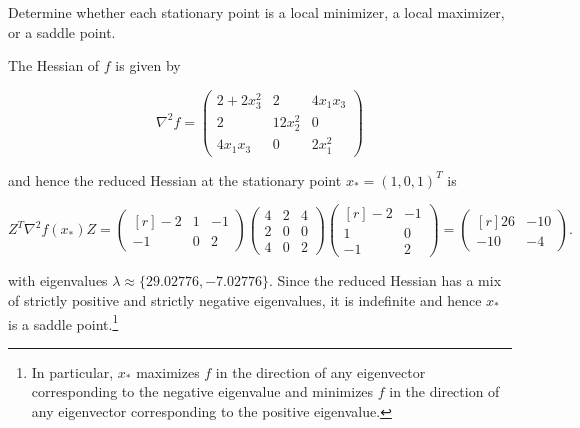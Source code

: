 Determine whether each stationary point is a local minimizer, a local maximizer, or a saddle point.

\begin{solution}
    The Hessian of $f$ is given by 

    $$
    \nabla^2 f = \begin{pmatrix*}
        2 + 2 x_3^2 & 2        & 4 x_1 x_3 \\
        2           & 12 x_2^2 & 0 \\
        4 x_1 x_3   & 0        & 2 x_1^2
    \end{pmatrix*}
    $$

    and hence the reduced Hessian at the stationary point $x_* = (1, 0, 1)^T$ is

    $$
    Z^T \nabla^2 f(x_*) Z = \begin{pmatrix*}[r]
        -2 & 1 & -1 \\
        -1 & 0 &  2
    \end{pmatrix*} \begin{pmatrix*}
        4 & 2 & 4 \\
        2 & 0 & 0 \\
        4 & 0 & 2
    \end{pmatrix*} \begin{pmatrix*}[r]
        -2 & -1 \\
         1 & 0  \\
        -1 & 2
    \end{pmatrix*} = \begin{pmatrix*}[r]
        26 & -10 \\
       -10 & -4
    \end{pmatrix*}.
    $$

    with eigenvalues $\lambda \approx \{29.02776, -7.02776\}$. Since the reduced Hessian has a mix of strictly positive 
    and strictly negative eigenvalues, it is indefinite and hence $x_*$ is a saddle point.\footnote{
        In particular, $x_*$ maximizes $f$ in the direction of any eigenvector corresponding to the negative eigenvalue
        and minimizes $f$ in the direction of any eigenvector corresponding to the positive eigenvalue.
    }
    \ \\
\end{solution}